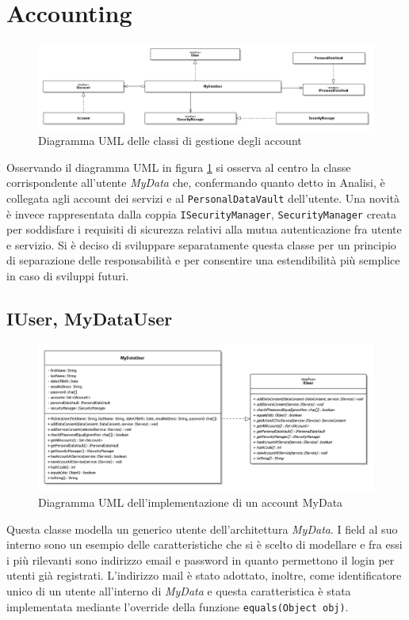 \section{Accounting}
\label{sec:P-accounting}
\begin{figure} [h]
	\includegraphics[width=\linewidth]{pictures/Accounting-closed.png}
	\caption{Diagramma UML delle classi di gestione degli account}
	\label{fig:Accounting-closed}
\end{figure}
Osservando il diagramma UML in figura \ref{fig:Accounting-closed} si osserva al centro la classe corrispondente all’utente \textit{MyData} che, confermando quanto detto in Analisi, \`e collegata agli account dei servizi e al \texttt{PersonalDataVault} dell’utente. Una novit\`a \`e invece rappresentata dalla coppia \texttt{ISecurityManager}, \texttt{SecurityManager} creata per soddisfare i requisiti di sicurezza relativi alla mutua autenticazione fra utente e servizio. Si \`e deciso di sviluppare separatamente questa classe per un principio di separazione delle responsabilit\`a e per consentire una estendibilit\`a pi\`u semplice in caso di sviluppi futuri.

\subsection{IUser, MyDataUser}
\begin{figure} [h]
	\includegraphics[width=\linewidth]{pictures/Accounting-MyDataUsr.png}
	\caption{Diagramma UML dell'implementazione di un account MyData}
	\label{fig:Accounting-MyDatUsr}
\end{figure}
Questa classe modella un generico utente dell’architettura \textit{MyData}. I field al suo interno sono un esempio delle caratteristiche che si \`e scelto di modellare e fra essi i pi\`u rilevanti sono indirizzo email e password in quanto permettono il login per utenti gi\`a registrati. L’indirizzo mail \`e stato adottato, inoltre, come identificatore unico di un utente all’interno di \textit{MyData} e questa caratteristica \`e stata implementata mediante l’override della funzione \texttt{equals(Object obj)}.

